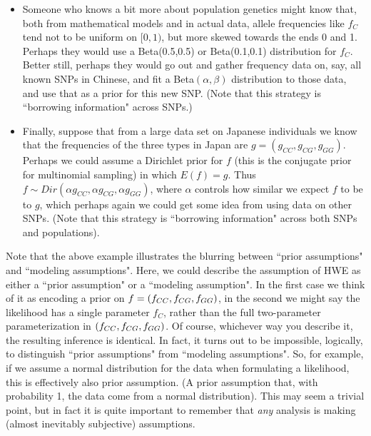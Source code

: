 \documentclass[12pt]{article}
\begin{document}
\begin{enumerate}
\begin{itemize}
 \item Someone who knows a bit more about population genetics might know that, both from mathematical models and in actual data, allele frequencies like $f_C$ tend not to be uniform on $[0,1)$, but more skewed towards the ends 0 and 1. Perhaps they would use a Beta(0.5,0.5) or Beta(0.1,0.1) distribution for $f_C$. Better still, perhaps they would go out and gather frequency data on, say, all known SNPs in Chinese, and fit a Beta$(\alpha, \beta)$ distribution to those data,
 and use that as a prior for this new SNP. (Note that this strategy is ``borrowing information" across SNPs.)
 \item  Finally, suppose that from a large data set on Japanese individuals we know that the frequencies of the three types in Japan are $g=(g_{CC},g_{CG},g_{GG})$. Perhaps we could
 assume a Dirichlet prior for $f$ (this is the
 conjugate prior for multinomial sampling) in which $E(f)=g$. Thus $f \sim Dir(\alpha g_{CC},\alpha g_{CG}, \alpha g_{GG})$, where $\alpha$ controls how similar we expect $f$ to be to $g$, which 
 perhaps again we could get some idea from using data on other SNPs. (Note that this strategy
 is ``borrowing information" across both SNPs and populations).
   \end{itemize}
 Note that the above example illustrates the blurring between ``prior assumptions" and ``modeling assumptions". Here, we could describe the assumption of HWE as either
 a ``prior assumption" or a ``modeling assumption". In the first case we think of it as encoding a prior on $f=(f_{CC},f_{CG},f_{GG})$, in the second we might say the
 likelihood has a single parameter $f_C$, rather than the full two-parameter parameterization in $(f_{CC},f_{CG},f_{GG})$.
 Of course, whichever way you describe it, the resulting inference is identical.
 In fact, it turns out to be impossible, logically, to distinguish ``prior assumptions" from ``modeling assumptions". 
 So, for example, if we assume a normal distribution for the data when formulating a likelihood, this is effectively also prior assumption.
(A prior assumption that, with probability 1, the data come from a normal distribution). This may seem a trivial point, but in fact it is quite important
to remember that {\it any} analysis is making (almost inevitably subjective) assumptions. 


\end{enumerate}
\end{document}
